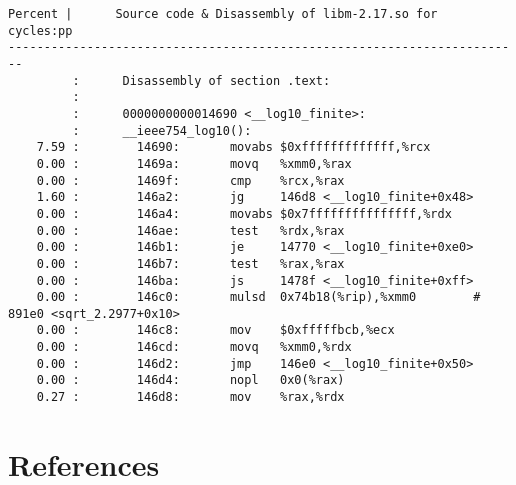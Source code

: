\documentclass[a4paper]{jpconf}
\begin{document}
\begin{appendices}
\begin{minipage}{\linewidth}
\begin{lstlisting}[language={[x64]Assembler}, basicstyle=\ttfamily\tiny,
caption=\_\_log10\_finite cycles annotation, label=lst:log10]
Percent |      Source code & Disassembly of libm-2.17.so for  cycles:pp
------------------------------------------------------------------------
         :      Disassembly of section .text:
         :
         :      0000000000014690 <__log10_finite>:
         :      __ieee754_log10():
    7.59 :        14690:       movabs $0xfffffffffffff,%rcx
    0.00 :        1469a:       movq   %xmm0,%rax
    0.00 :        1469f:       cmp    %rcx,%rax
    1.60 :        146a2:       jg     146d8 <__log10_finite+0x48>
    0.00 :        146a4:       movabs $0x7fffffffffffffff,%rdx
    0.00 :        146ae:       test   %rdx,%rax
    0.00 :        146b1:       je     14770 <__log10_finite+0xe0>
    0.00 :        146b7:       test   %rax,%rax
    0.00 :        146ba:       js     1478f <__log10_finite+0xff>
    0.00 :        146c0:       mulsd  0x74b18(%rip),%xmm0        # 891e0 <sqrt_2.2977+0x10>
    0.00 :        146c8:       mov    $0xfffffbcb,%ecx
    0.00 :        146cd:       movq   %xmm0,%rdx
    0.00 :        146d2:       jmp    146e0 <__log10_finite+0x50>
    0.00 :        146d4:       nopl   0x0(%rax)
    0.27 :        146d8:       mov    %rax,%rdx
\end{lstlisting}
\end{minipage}


\end{appendices}
\section*{References}


\end{document}
